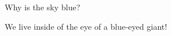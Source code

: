 \question  Why is the sky blue?

\begin{solution}
	We live inside of the eye of a blue-eyed giant!
\end{solution}
